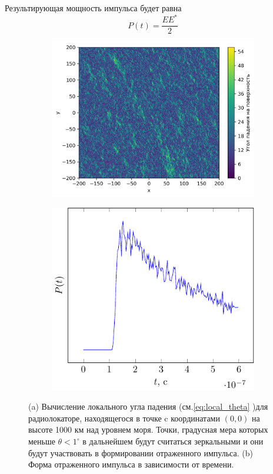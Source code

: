  Результирующая мощность импульса будет равна
 \begin{equation}
     P(t) = \frac{EE^*}{2}
 \end{equation}
 \begin{figure}[h]
     \begin{subfigure}{.55\linewidth}
         \centering
         \includegraphics[width=\linewidth]{img/theta0}
         \caption{}
     \end{subfigure}
     \hfill
     \begin{subfigure}{.45\linewidth}
         \centering
         \includegraphics[width=\linewidth]{fig/theta}
         \caption{}
     \end{subfigure}
     \caption{(a) Вычисление локального угла падения (см.\eqref{eq:local_theta} )для радиолокаторе,
     находящегося в точке c координатами $(0,0)$ на высоте 1000 км над уровнем
     моря.  Точки, градусная мера которых меньше
     $\theta<1^\circ$ в 
 дальнейшем будут считаться зеркальными и они будут участвовать в
 формировании отраженного импульса.
 (b) Форма отраженного импульса в зависимости от времени.}
    \label{fig:model_impuls}
 \end{figure}


